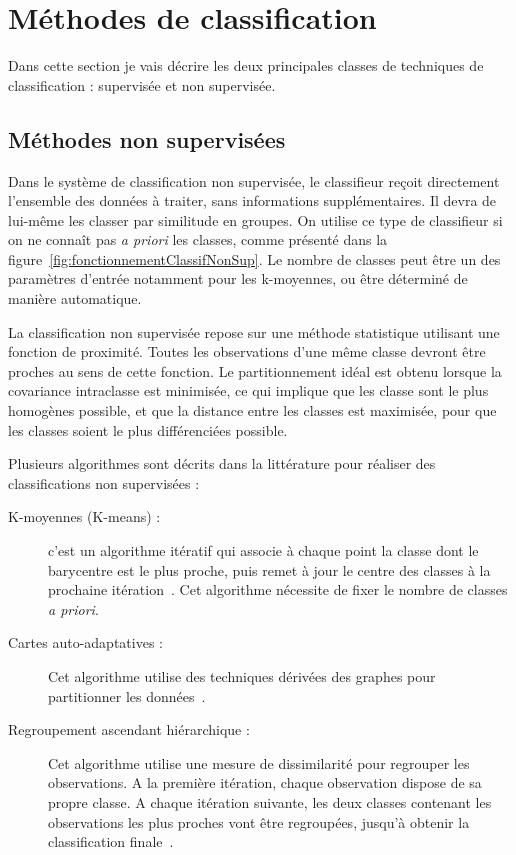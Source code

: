 	\section{Méthodes de classification}

Dans cette section je vais décrire les deux principales classes de techniques de classification : supervisée et non supervisée.


		\subsection{Méthodes non supervisées}

Dans le système de classification non supervisée, le classifieur reçoit directement l'ensemble des données à traiter, sans informations supplémentaires. Il devra de lui-même les classer par similitude en groupes. On utilise ce type de classifieur si on ne connaît pas \textit{a priori} les classes, comme présenté dans la figure~\ref{fig:fonctionnementClassifNonSup}. Le nombre de classes peut être un des paramètres d'entrée notamment pour les k-moyennes, ou être déterminé de manière automatique.


La classification non supervisée repose sur une méthode statistique utilisant une fonction de proximité. Toutes les observations d'une même classe devront être proches au sens de cette fonction. Le partitionnement idéal est obtenu lorsque la covariance intraclasse est minimisée, ce qui implique que les classe sont le plus homogènes possible, et que la distance entre les classes est maximisée, pour que les classes soient le plus différenciées possible.

Plusieurs algorithmes sont décrits dans la littérature pour réaliser des classifications non supervisées :

\begin{description}
 \item[K-moyennes (K-means) : ]  c'est un algorithme itératif qui associe à chaque point la classe dont le barycentre est le plus proche, puis remet à jour le centre des classes à la prochaine itération~\cite{herwig1999large}. Cet algorithme nécessite de fixer le nombre de classes \textit{a priori}.
 \item[Cartes auto-adaptatives : ] Cet algorithme utilise des techniques dérivées des graphes pour partitionner les données~\cite{kohonen1982self}.
 \item[Regroupement ascendant hiérarchique : ] Cet algorithme utilise une mesure de dissimilarité pour regrouper les observations. A la première itération, chaque observation dispose de sa propre classe. A chaque itération suivante, les deux classes contenant les observations les plus proches vont être regroupées, jusqu'à obtenir la classification finale~\cite{ward1963hierarchical}.
\end{description}


